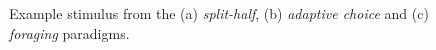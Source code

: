 \documentclass[]{rsos}%
\begin{document}
\begin{figure}
\centering
{}
\caption{Example stimulus from the (a) \textit{split-half}, (b) \textit{adaptive choice} and (c) \textit{foraging} paradigms.}
\label{fig:exampleStimuli}
\end{figure}
\end{document}

